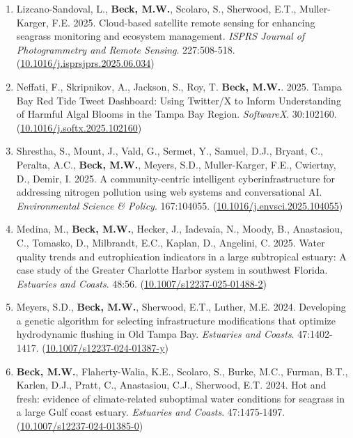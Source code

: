 \documentclass[letterpaper,12pt]{article}
\begin{document}
\begin{enumerate}
\item Lizcano-Sandoval, L., \textbf{Beck, M.W.}, Scolaro, S., Sherwood, E.T., Muller-Karger, F.E. 2025. Cloud-based satellite remote sensing for enhancing seagrass monitoring and ecosystem management. \textit{ISPRS Journal of Photogrammetry and Remote Sensing}. 227:508-518. ({\footnotesize\href{https://doi.org/10.1016/j.isprsjprs.2025.06.034}{10.1016/j.isprsjprs.2025.06.034}})

\item Neffati, F., Skripnikov, A., Jackson, S., Roy, T. \textbf{Beck, M.W.}. 2025. Tampa Bay Red Tide Tweet Dashboard: Using Twitter/X to Inform Understanding of Harmful Algal Blooms in the Tampa Bay Region. \textit{SoftwareX}. 30:102160. ({\footnotesize\href{https://doi.org/10.1016/j.softx.2025.102160}{10.1016/j.softx.2025.102160}}) 

\item Shrestha, S., Mount, J., Vald, G., Sermet, Y., Samuel, D.J., Bryant, C., Peralta, A.C., \textbf{Beck, M.W.}, Meyers, S.D., Muller-Karger, F.E., Cwiertny, D., Demir, I. 2025. A community-centric intelligent cyberinfrastructure for addressing nitrogen pollution using web systems and conversational AI. \textit{Environmental Science \& Policy}. 167:104055. ({\footnotesize\href{https://doi.org/10.1016/j.envsci.2025.104055}{10.1016/j.envsci.2025.104055}}) 

\item Medina, M., \textbf{Beck, M.W.}, Hecker, J., Iadevaia, N., Moody, B., Anastasiou, C., Tomasko, D., Milbrandt, E.C., Kaplan, D., Angelini, C. 2025. Water quality trends and eutrophication indicators in a large subtropical estuary: A case study of the Greater Charlotte Harbor system in southwest Florida. \textit{Estuaries and Coasts}. 48:56. ({\footnotesize\href{https://doi.org/10.1007/s12237-025-01488-2}{10.1007/s12237-025-01488-2}})

\item Meyers, S.D., \textbf{Beck, M.W.}, Sherwood, E.T., Luther, M.E. 2024. Developing a genetic algorithm for selecting infrastructure modifications that optimize hydrodynamic flushing in Old Tampa Bay. \textit{Estuaries and Coasts}. 47:1402-1417. ({\footnotesize\href{https://doi.org/10.1007/s12237-024-01387-y}{10.1007/s12237-024-01387-y}})

\item \textbf{Beck, M.W.}, Flaherty-Walia, K.E., Scolaro, S., Burke, M.C., Furman, B.T., Karlen, D.J., Pratt, C., Anastasiou, C.J., Sherwood, E.T. 2024. Hot and fresh: evidence of climate-related suboptimal water conditions for seagrass in a large Gulf coast estuary. \textit{Estuaries and Coasts}. 47:1475-1497. ({\footnotesize\href{https://doi.org/10.1007/s12237-024-01385-0}{10.1007/s12237-024-01385-0}})


\end{enumerate}
\end{document}
